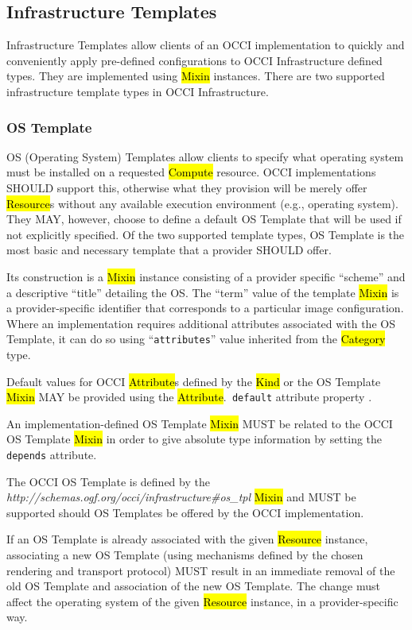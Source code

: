 \documentclass[10pt,a4paper]{article}
\begin{document}
\subsection{Infrastructure Templates}
Infrastructure Templates allow clients of an OCCI implementation to
quickly and conveniently apply pre-defined configurations to OCCI
Infrastructure defined types. They are implemented using \hl{Mixin}
instances. There are two supported infrastructure template types in OCCI
Infrastructure.

\subsubsection{OS Template}
\label{subsubsec:os_tpl}
OS (Operating System) Templates allow clients to specify what operating
system must be installed on a requested \hl{Compute} resource. OCCI
implementations SHOULD support this, otherwise what they provision
will be merely offer \hl{Resource}s without any available execution
environment (e.g., operating system). They MAY, however, choose to define
a default OS Template that will be used if not explicitly specified.
Of the two supported template types, OS Template is the most basic
and necessary template that a provider SHOULD offer.

Its construction is a \hl{Mixin} instance consisting of a provider
specific ``scheme'' and a descriptive ``title'' detailing the OS. The
``term'' value of the template \hl{Mixin} is a provider-specific
identifier that corresponds to a particular image configuration. Where
an implementation requires additional attributes associated with the
OS Template, it can do so using ``{\tt attributes}'' value inherited
from the \hl{Category} type.

Default values for OCCI \hl{Attribute}s defined by the \hl{Kind} or the OS
Template \hl{Mixin} MAY be provided using the \hl{Attribute}.{\tt
  default} attribute property \cite{occi:core}.

An implementation-defined OS Template \hl{Mixin} MUST be related to the
OCCI OS Template \hl{Mixin} in order to give absolute type
information by setting the \texttt{depends} attribute.

The OCCI OS Template is defined by the
\textit{http://schemas.ogf.org/occi/infrastructure\#os\_tpl}
\hl{Mixin} and MUST be supported should OS Templates be offered by the
OCCI implementation.

If an OS Template is already associated with the given \hl{Resource}
instance, associating a new OS Template (using mechanisms defined
by the chosen rendering and transport protocol) MUST result in
an immediate removal of the old OS Template and association of the new
OS Template. The change must affect the operating system of the given
\hl{Resource} instance, in a provider-specific way.
\end{document}
